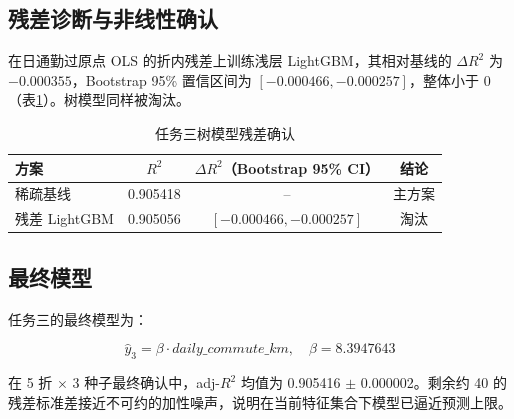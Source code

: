 \subsection{残差诊断与非线性确认}

在日通勤过原点 OLS 的折内残差上训练浅层 LightGBM，其相对基线的 $\Delta R^2$ 为 $-0.000355$，Bootstrap 95\% 置信区间为 $[-0.000466, -0.000257]$，整体小于 0（表\ref{tab:t3_tree}）。树模型同样被淘汰。

\begin{table}[H]
\centering
\caption{任务三树模型残差确认}
\label{tab:t3_tree}
\begin{tabular}{lccc}
\toprule
\textbf{方案} & \textbf{$R^2$} & \textbf{$\Delta R^2$（Bootstrap 95\% CI）} & \textbf{结论} \\
\midrule
稀疏基线 & 0.905418 & -- & 主方案 \\
残差 LightGBM & 0.905056 & $[-0.000466, -0.000257]$ & 淘汰 \\
\bottomrule
\end{tabular}
\end{table}

\subsection{最终模型}

任务三的最终模型为：

\begin{equation}
\hat{y}_3 = \beta \cdot daily\_commute\_km, \quad \beta = 8.3947643
\label{eq:t3}
\end{equation}

在 5 折 $\times$ 3 种子最终确认中，adj-$R^2$ 均值为 0.905416 $\pm$ 0.000002。剩余约 40 的残差标准差接近不可约的加性噪声，说明在当前特征集合下模型已逼近预测上限。
